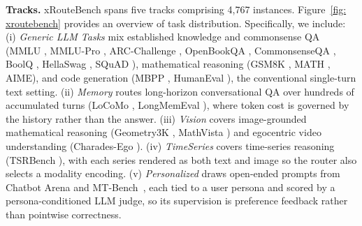 \noindent\textbf{Tracks.} xRouteBench spans five tracks comprising 4{,}767 instances. Figure~\ref{fig: xroutebench} provides an overview of task distribution. Specifically, we include: 
(i) \textit{Generic LLM Tasks} mix established knowledge and commonsense QA (MMLU \citep{hendrycks2020measuring}, MMLU-Pro \citep{wang2024mmlupro}, ARC-Challenge \citep{allenai:arc}, OpenBookQA \citep{mihaylov2018can}, CommonsenseQA \citep{talmor2019commonsenseqa}, BoolQ \citep{clark2019boolq}, HellaSwag \citep{zellers2019hellaswag}, SQuAD \citep{rajpurkar2016squad}), mathematical reasoning (GSM8K \citep{cobbe2021training}, MATH \citep{hendrycks2021measuring}, AIME), and code generation (MBPP \citep{austin2021program}, HumanEval \citep{chen2021evaluating}), the conventional single-turn text setting.
(ii) \textit{Memory} routes long-horizon conversational QA over hundreds of accumulated turns (LoCoMo \citep{maharana2024evaluating}, LongMemEval \citep{wu2024longmemeval}), where token cost is governed by the history rather than the answer.
(iii) \textit{Vision} covers image-grounded mathematical reasoning (Geometry3K \citep{lu2021inter}, MathVista \citep{lu2024mathvista}) and egocentric video understanding (Charades-Ego \citep{sigurdsson2018charades}).
(iv) \textit{TimeSeries} covers time-series reasoning (TSRBench \citep{yu2026tsrbench}), with each series rendered as both text and image so the router also selects a modality encoding.
(v) \textit{Personalized} draws open-ended prompts from Chatbot Arena and MT-Bench~\citep{zheng2023judging}, each tied to a user persona and scored by a persona-conditioned LLM judge, so its supervision is preference feedback rather than pointwise correctness.


